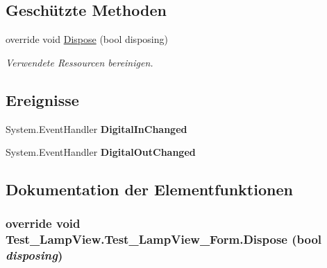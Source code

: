 \subsection*{Geschützte Methoden}
\begin{DoxyCompactItemize}
\item 
override void \hyperlink{class_test___lamp_view_1_1_test___lamp_view___form_a867822dded05866aed7e0345c4d45033}{Dispose} (bool disposing)
\begin{DoxyCompactList}\small\item\em Verwendete Ressourcen bereinigen. \item\end{DoxyCompactList}\end{DoxyCompactItemize}
\subsection*{Ereignisse}
\begin{DoxyCompactItemize}
\item 
\hypertarget{class_test___lamp_view_1_1_test___lamp_view___form_a6fc145512e96f2734827edcfdac90bea}{
System.EventHandler {\bfseries DigitalInChanged}}
\label{class_test___lamp_view_1_1_test___lamp_view___form_a6fc145512e96f2734827edcfdac90bea}

\item 
\hypertarget{class_test___lamp_view_1_1_test___lamp_view___form_a972715ffe1356292119585c01f13c87c}{
System.EventHandler {\bfseries DigitalOutChanged}}
\label{class_test___lamp_view_1_1_test___lamp_view___form_a972715ffe1356292119585c01f13c87c}

\end{DoxyCompactItemize}


\subsection{Dokumentation der Elementfunktionen}
\hypertarget{class_test___lamp_view_1_1_test___lamp_view___form_a867822dded05866aed7e0345c4d45033}{
\subsubsection[{Dispose}]{\setlength{\rightskip}{0pt plus 5cm}override void Test\_\-LampView.Test\_\-LampView\_\-Form.Dispose (bool {\em disposing})}}
\label{class_test___lamp_view_1_1_test___lamp_view___form_a867822dded05866aed7e0345c4d45033}


